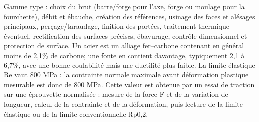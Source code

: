 \begin{corrigebox}
Gamme type : choix du brut (barre/forge pour l'axe, forge ou moulage pour
            la fourchette), débit et ébauche, création des références, usinage des faces et
            alésages principaux, perçage/taraudage, finition des portées, traitement
            thermique éventuel, rectification des surfaces précises, ébavurage, contrôle
            dimensionnel et protection de surface.
Un acier est un alliage fer--carbone contenant en général moins de
            2,1\% de carbone; une fonte en contient davantage, typiquement 2,1 à 6,7\%,
            avec une bonne coulabilité mais une ductilité plus faible.
La limite élastique Re vaut 800 MPa : la contrainte normale maximale avant
            déformation plastique mesurable est donc de 800 MPa. Cette valeur est obtenue
            par un essai de traction sur une éprouvette normalisée : mesure de la force F et
            de la variation de longueur, calcul de la contrainte et de la déformation, puis
            lecture de la limite élastique ou de la limite conventionnelle Rp0,2.
\end{corrigebox}
